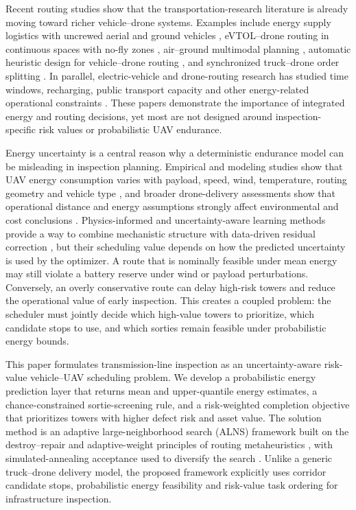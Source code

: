Recent routing studies show that the transportation-research literature is already moving toward richer vehicle--drone systems. Examples include energy supply logistics with uncrewed aerial and ground vehicles \citep{kim2026bidirectional}, eVTOL--drone routing in continuous spaces with no-fly zones \citep{liu2026evtol}, air--ground multimodal planning \citep{zhang2026airground}, automatic heuristic design for vehicle--drone routing \citep{shi2026llm}, and synchronized truck--drone order splitting \citep{yang2025integrated}. In parallel, electric-vehicle and drone-routing research has studied time windows, recharging, public transport capacity and other energy-related operational constraints \citep{schneider2014evrptw,desaulniers2016evrp,moadab2022drone}. These papers demonstrate the importance of integrated energy and routing decisions, yet most are not designed around inspection-specific risk values or probabilistic UAV endurance.

Energy uncertainty is a central reason why a deterministic endurance model can be misleading in inspection planning. Empirical and modeling studies show that UAV energy consumption varies with payload, speed, wind, temperature, routing geometry and vehicle type \citep{stolaroff2018energy,zhang2021energyconsumption,aiello2021energy,dukkanci2021range,jeong2019payloaddrone}, and broader drone-delivery assessments show that operational distance and energy assumptions strongly affect environmental and cost conclusions \citep{goodchild2018delivery,figliozzi2017lifecycle}. Physics-informed and uncertainty-aware learning methods provide a way to combine mechanistic structure with data-driven residual correction \citep{raissi2019pinn,karniadakis2021piml,yang2021bpinn}, but their scheduling value depends on how the predicted uncertainty is used by the optimizer. A route that is nominally feasible under mean energy may still violate a battery reserve under wind or payload perturbations. Conversely, an overly conservative route can delay high-risk towers and reduce the operational value of early inspection. This creates a coupled problem: the scheduler must jointly decide which high-value towers to prioritize, which candidate stops to use, and which sorties remain feasible under probabilistic energy bounds.

This paper formulates transmission-line inspection as an uncertainty-aware risk-value vehicle--UAV scheduling problem. We develop a probabilistic energy prediction layer that returns mean and upper-quantile energy estimates, a chance-constrained sortie-screening rule, and a risk-weighted completion objective that prioritizes towers with higher defect risk and asset value. The solution method is an adaptive large-neighborhood search (ALNS) framework built on the destroy--repair and adaptive-weight principles of routing metaheuristics \citep{ropke2006alns,sacramento2019alns,asoc2023recharging}, with simulated-annealing acceptance used to diversify the search \citep{kirkpatrick1983annealing}. Unlike a generic truck--drone delivery model, the proposed framework explicitly uses corridor candidate stops, probabilistic energy feasibility and risk-value task ordering for infrastructure inspection.

